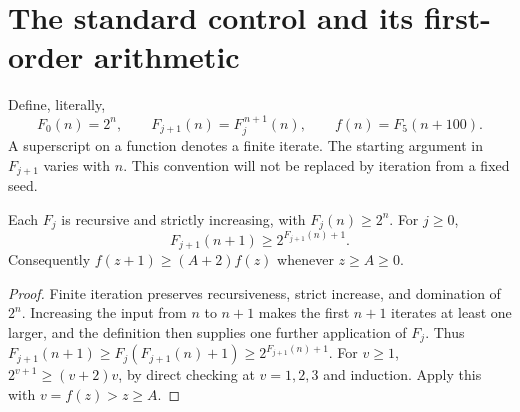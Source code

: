 \section{The standard control and its first-order arithmetic}
\label{m:sec:control}
Define, literally,
\begin{equation}\label{m:eq:f}
 F_0(n)=2^n,\qquad F_{j+1}(n)=F_j^{\,n+1}(n),\qquad
 f(n)=F_5(n+100).
\end{equation}
A superscript on a function denotes a finite iterate. The starting argument
in $F_{j+1}$ varies with $n$. This convention will not be replaced by
iteration from a fixed seed.

\begin{lemma}[Growth]\label{m:lem:growth}
Each $F_j$ is recursive and strictly increasing, with $F_j(n)\ge2^n$.
For $j\ge0$,
\[
 F_{j+1}(n+1)\ge2^{F_{j+1}(n)+1}.
\]
Consequently $f(z+1)\ge(A+2)f(z)$ whenever $z\ge A\ge0$.
\end{lemma}
\begin{proof}
Finite iteration preserves recursiveness, strict increase, and domination
of $2^n$. Increasing the input from $n$ to $n+1$ makes the first $n+1$
iterates at least one larger, and the definition then supplies one further
application of $F_j$. Thus
$F_{j+1}(n+1)\ge F_j(F_{j+1}(n)+1)\ge2^{F_{j+1}(n)+1}$.
For $v\ge1$, $2^{v+1}\ge(v+2)v$, by direct checking at $v=1,2,3$ and
induction. Apply this with $v=f(z)>z\ge A$.
\end{proof}

